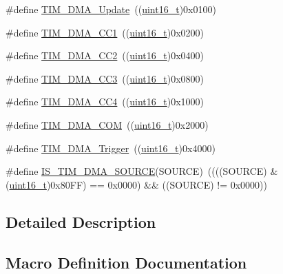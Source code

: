 \begin{DoxyCompactItemize}
\item 
\#define \hyperlink{group___t_i_m___d_m_a__sources_ga013a49e5cceb263f01941aef968dea9c}{T\+I\+M\+\_\+\+D\+M\+A\+\_\+\+Update}~((\hyperlink{_p_e___types_8h_a1f1825b69244eb3ad2c7165ddc99c956}{uint16\+\_\+t})0x0100)
\item 
\#define \hyperlink{group___t_i_m___d_m_a__sources_ga33b93e8bb82fe8e167b9e9c962c54f83}{T\+I\+M\+\_\+\+D\+M\+A\+\_\+\+C\+C1}~((\hyperlink{_p_e___types_8h_a1f1825b69244eb3ad2c7165ddc99c956}{uint16\+\_\+t})0x0200)
\item 
\#define \hyperlink{group___t_i_m___d_m_a__sources_ga792f73196a8e7424655592097d7a3fd5}{T\+I\+M\+\_\+\+D\+M\+A\+\_\+\+C\+C2}~((\hyperlink{_p_e___types_8h_a1f1825b69244eb3ad2c7165ddc99c956}{uint16\+\_\+t})0x0400)
\item 
\#define \hyperlink{group___t_i_m___d_m_a__sources_ga3eb2dadbd3109bced45935fb53deeee1}{T\+I\+M\+\_\+\+D\+M\+A\+\_\+\+C\+C3}~((\hyperlink{_p_e___types_8h_a1f1825b69244eb3ad2c7165ddc99c956}{uint16\+\_\+t})0x0800)
\item 
\#define \hyperlink{group___t_i_m___d_m_a__sources_ga59495cf79894dfe5e5b2029863aed956}{T\+I\+M\+\_\+\+D\+M\+A\+\_\+\+C\+C4}~((\hyperlink{_p_e___types_8h_a1f1825b69244eb3ad2c7165ddc99c956}{uint16\+\_\+t})0x1000)
\item 
\#define \hyperlink{group___t_i_m___d_m_a__sources_gac5f4c56e944bda8ba0c23b97275020ba}{T\+I\+M\+\_\+\+D\+M\+A\+\_\+\+C\+OM}~((\hyperlink{_p_e___types_8h_a1f1825b69244eb3ad2c7165ddc99c956}{uint16\+\_\+t})0x2000)
\item 
\#define \hyperlink{group___t_i_m___d_m_a__sources_ga81ad169a378969524e61396337d84a0a}{T\+I\+M\+\_\+\+D\+M\+A\+\_\+\+Trigger}~((\hyperlink{_p_e___types_8h_a1f1825b69244eb3ad2c7165ddc99c956}{uint16\+\_\+t})0x4000)
\item 
\#define \hyperlink{group___t_i_m___d_m_a__sources_gafb9cb1995ea4cd37db6032d80a49cd47}{I\+S\+\_\+\+T\+I\+M\+\_\+\+D\+M\+A\+\_\+\+S\+O\+U\+R\+CE}(S\+O\+U\+R\+CE)~((((S\+O\+U\+R\+CE) \& (\hyperlink{_p_e___types_8h_a1f1825b69244eb3ad2c7165ddc99c956}{uint16\+\_\+t})0x80\+F\+F) == 0x0000) \&\& ((\+S\+O\+U\+R\+C\+E) != 0x0000))
\end{DoxyCompactItemize}


\subsection{Detailed Description}


\subsection{Macro Definition Documentation}
